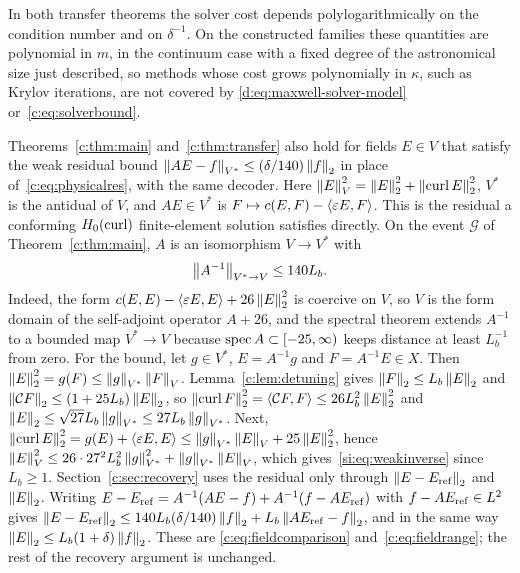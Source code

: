 In both transfer theorems the solver cost depends polylogarithmically on
the condition number and on $\delta^{-1}$. On the constructed families
these quantities are polynomial in $m$, in the continuum case with a fixed
degree of the astronomical size just described, so methods whose cost
grows polynomially in $\kappa$, such as Krylov iterations, are not covered by
\eqref{d:eq:maxwell-solver-model} or~\eqref{c:eq:solverbound}.

\begin{remark}
\label{si:rem:weak-residual}
Theorems~\ref{c:thm:main} and~\ref{c:thm:transfer} also hold for fields
$E\in V$ that satisfy the weak residual bound
$\left\lVert AE-f\right\rVert_{V^*}\le(\delta/140)\left\lVert f\right\rVert_2$ in place
of~\eqref{c:eq:physicalres}, with the same decoder. Here
$\left\lVert E\right\rVert_V^2=\left\lVert E\right\rVert_2^2+\left\lVert \operatorname{curl} E\right\rVert_2^2$, $V^*$ is the
antidual of $V$, and $AE\in V^*$ is
$F\mapsto c(E,F)-\left\langle \varepsilon E,F\right\rangle$. This is the residual a
conforming $H_0(\operatorname{curl})$ finite-element solution satisfies directly.
On the event $\mathcal G$ of Theorem~\ref{c:thm:main}, $A$ is an
isomorphism $V\to V^*$ with
\begin{equation}
 \left\lVert A^{-1}\right\rVert_{V^*\to V}\le140L_b.          \label{si:eq:weakinverse}
\end{equation}
Indeed, the form $c(E,E)-\left\langle \varepsilon E,E\right\rangle+26\left\lVert E\right\rVert_2^2$ is
coercive on $V$, so $V$ is the form domain of the self-adjoint operator
$A+26$, and the spectral theorem extends $A^{-1}$ to a bounded map
$V^*\to V$ because $\operatorname{spec} A\subset[-25,\infty)$ keeps distance at
least $L_b^{-1}$ from zero. For the bound, let $g\in V^*$, $E=A^{-1}g$
and $F=A^{-1}E\in X$. Then $\left\lVert E\right\rVert_2^2=g(F)\le\left\lVert g\right\rVert_{V^*}\left\lVert F\right\rVert_V$.
Lemma~\ref{c:lem:detuning} gives $\left\lVert F\right\rVert_2\le L_b\left\lVert E\right\rVert_2$ and
$\left\lVert \mathcal C F\right\rVert_2\le(1+25L_b)\left\lVert E\right\rVert_2$, so
$\left\lVert \operatorname{curl} F\right\rVert_2^2=\left\langle \mathcal C F,F\right\rangle\le26L_b^2\left\lVert E\right\rVert_2^2$ and
$\left\lVert E\right\rVert_2\le\sqrt{27}L_b\left\lVert g\right\rVert_{V^*}\le27L_b\left\lVert g\right\rVert_{V^*}$.
Next, $\left\lVert \operatorname{curl} E\right\rVert_2^2=g(E)+\left\langle \varepsilon E,E\right\rangle
\le\left\lVert g\right\rVert_{V^*}\left\lVert E\right\rVert_V+25\left\lVert E\right\rVert_2^2$, hence
$\left\lVert E\right\rVert_V^2\le26\cdot27^2L_b^2\left\lVert g\right\rVert_{V^*}^2+\left\lVert g\right\rVert_{V^*}\left\lVert E\right\rVert_V$,
which gives~\eqref{si:eq:weakinverse} since $L_b\ge1$.
Section~\ref{c:sec:recovery} uses the residual only through
$\left\lVert E-E_{\rm ref}\right\rVert_2$ and $\left\lVert E\right\rVert_2$. Writing
$E-E_{\rm ref}=A^{-1}(AE-f)+A^{-1}(f-AE_{\rm ref})$ with
$f-AE_{\rm ref}\in L^2$ gives
$\left\lVert E-E_{\rm ref}\right\rVert_2\le140L_b(\delta/140)\left\lVert f\right\rVert_2
+L_b\left\lVert AE_{\rm ref}-f\right\rVert_2$, and in the same way
$\left\lVert E\right\rVert_2\le L_b(1+\delta)\left\lVert f\right\rVert_2$. These are
\eqref{c:eq:fieldcomparison} and~\eqref{c:eq:fieldrange}; the rest of the
recovery argument is unchanged.
\end{remark}

